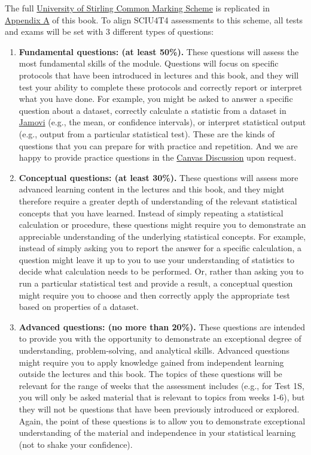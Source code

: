\documentclass[
]{scrbook}
\begin{document}
The full \href{https://www.stir.ac.uk/about/professional-services/student-academic-and-corporate-services/academic-registry/academic-policy-and-practice/quality-handbook/assessment-policy-and-procedure/appendix-1-undergraduate-common-marking-scheme/}{University of Stirling Common Marking Scheme} is replicated in \protect\hyperlink{appendexA_CMS}{Appendix A} of this book.
To align SCIU4T4 assessments to this scheme, all tests and exams will be set with 3 different types of questions:

\begin{enumerate}
\def\labelenumi{\arabic{enumi}.}
\item
  \textbf{Fundamental questions: (at least 50\%).} These questions will assess the most fundamental skills of the module. Questions will focus on specific protocols that have been introduced in lectures and this book, and they will test your ability to complete these protocols and correctly report or interpret what you have done. For example, you might be asked to answer a specific question about a dataset, correctly calculate a statistic from a dataset in \protect\hyperlink{jamovi}{Jamovi} (e.g., the mean, or confidence intervals), or interpret statistical output (e.g., output from a particular statistical test). These are the kinds of questions that you can prepare for with practice and repetition. And we are happy to provide practice questions in the \href{https://canvas.stir.ac.uk/courses/13075/discussion_topics}{Canvas Discussion} upon request.
\item
  \textbf{Conceptual questions: (at least 30\%).} These questions will assess more advanced learning content in the lectures and this book, and they might therefore require a greater depth of understanding of the relevant statistical concepts that you have learned. Instead of simply repeating a statistical calculation or procedure, these questions might require you to demonstrate an appreciable understanding of the underlying statistical concepts. For example, instead of simply asking you to report the answer for a specific calculation, a question might leave it up to you to use your understanding of statistics to decide what calculation needs to be performed. Or, rather than asking you to run a particular statistical test and provide a result, a conceptual question might require you to choose and then correctly apply the appropriate test based on properties of a dataset.
\item
  \textbf{Advanced questions: (no more than 20\%).} These questions are intended to provide you with the opportunity to demonstrate an exceptional degree of understanding, problem-solving, and analytical skills. Advanced questions might require you to apply knowledge gained from independent learning outside the lectures and this book. The topics of these questions will be relevant for the range of weeks that the assessment includes (e.g., for Test 1S, you will only be asked material that is relevant to topics from weeks 1-6), but they will not be questions that have been previously introduced or explored. Again, the point of these questions is to allow you to demonstrate exceptional understanding of the material and independence in your statistical learning (not to shake your confidence).

\end{enumerate}
\end{document}
